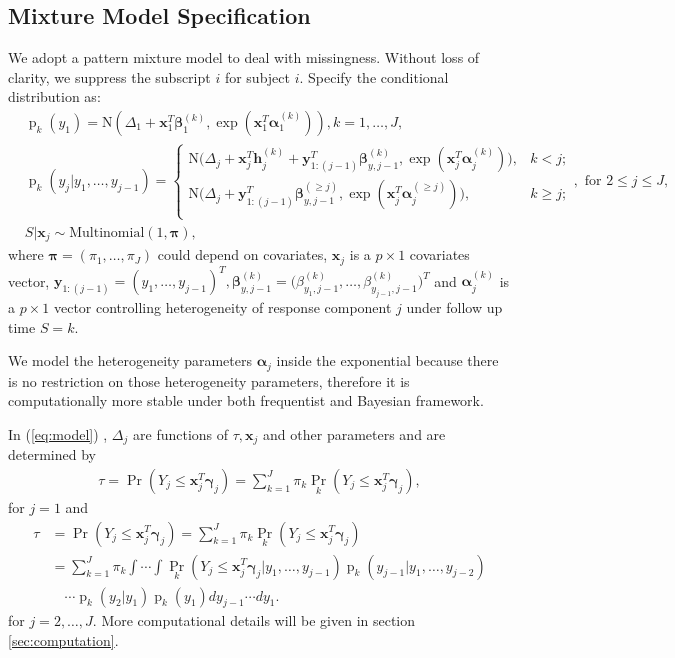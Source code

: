 \documentclass[12pt]{article}
\DeclareMathOperator{\pr}{p}
\DeclareMathOperator{\prob}{Pr}
\begin{document}
\subsection{Mixture Model Specification}
\label{sec:settings}
We adopt a pattern mixture model to deal with missingness.  Without
loss of clarity, we suppress the subscript $i$ for subject
$i$. Specify the conditional distribution as:
\begin{align}
  & \pr_k(y_1) = \textrm{N} (\Delta_1 + \bm x_1^T \bm \beta_1^{(k)},
  \exp (\bm x_{1}^T \bm \alpha_1^{(k)} ) ), k = 1, \ldots, J, \label{eq:model}\\
  &\pr_k(y_j|y_1, \ldots, y_{j-1}) =
  \begin{cases}
    \textrm{N} \big (\Delta_j + \bm x_{j}^T \bm h_{j}^{(k)} + \bm
    y_{1:(j-1)}^T \bm \beta_{y,j-1}^{(k)},
    \exp (\bm x_{j}^T \bm \alpha_j^{(k)} ) \big), & k < j ;  \nonumber \\
    \textrm{N} \big (\Delta_j + \bm y_{1:(j-1)}^T \bm
    \beta_{y,j-1}^{(\geq j)},
    \exp (\bm x_{j}^T \bm \alpha_j^{(\geq j)} ) \big), & k \geq j ; \nonumber \\
  \end{cases}, \text{ for } 2 \leq j \leq J, \nonumber \\
  &S| \bm x_j \sim \textrm{Multinomial}(1, \bm \pi), \nonumber
\end{align}
where $\bm \pi = (\pi_1, \ldots, \pi_J)$ could depend on covariates,
$\bm x_j$ is a $p \times 1$ covariates vector, $\bm y_{1:(j-1)} =
(y_1, \ldots, y_{j-1})^T, \bm \beta_{y, j-1}^{(k)} = \big(\beta_{y_1,
  j-1}^{(k)}, \ldots, \beta_{y_{j-1}, j-1}^{(k)} \big)^T$ and $\bm
\alpha_j^{(k)}$ is a $p \times 1$ vector controlling heterogeneity of
response component $j$ under follow up time $S = k$.

We model the heterogeneity parameters $\bm \alpha_j$ inside the
exponential because there is no restriction on those heterogeneity
parameters, therefore it is computationally more stable under both
frequentist and Bayesian framework.

In (\ref{eq:model}) , $\Delta_j$ are functions of $\tau, \bm x_j$ and
other parameters and are determined by
\begin{align}
  \label{eq:deltaeqn1}
  \tau = \prob (Y_j \leq \bm x_j^T \bm \gamma_j ) = \sum_{k=1}^J
  \pi_k\prob_k (Y_j \leq \bm x_j^T \bm \gamma_j ),
\end{align}
for $j = 1$ and
\begin{align}\label{eq:deltaeqn2}
  \tau &= \prob (Y_j \leq \bm x_j^{T} \bm \gamma_j ) = \sum_{k=1}^J
  \pi_k\prob_k (Y_j \leq \bm x_j^{T} \bm \gamma_j ) \\
  & = \sum_{k=1}^J \pi_k \int\cdots \int \prob_k (Y_j \leq \bm x_j^{T}
  \bm \gamma_j |y_1,\ldots,
  y_{j-1}) \pr_k (y_{j-1}| y_1, \ldots, y_{j-2})  \nonumber \\
  & \quad \cdots \pr_k (y_{2}| y_1) \pr_k(y_1) dy_{j-1}\cdots
  dy_1. \nonumber
\end{align}
for $j = 2, \ldots, J$. More computational details will be given in
section \ref{sec:computation}.
\end{document}
